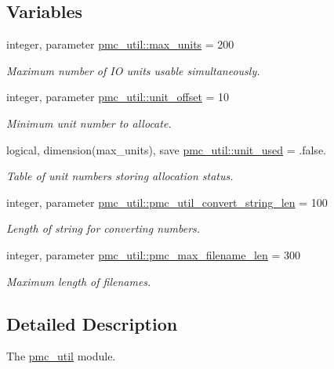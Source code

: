 \subsection*{Variables}
\begin{DoxyCompactItemize}
\item 
integer, parameter \mbox{\hyperlink{namespacepmc__util_a0bc01a46ad6e7b0d503c9181b1101ce0}{pmc\+\_\+util\+::max\+\_\+units}} = 200
\begin{DoxyCompactList}\small\item\em Maximum number of IO units usable simultaneously. \end{DoxyCompactList}\item 
integer, parameter \mbox{\hyperlink{namespacepmc__util_abd64d09b01c7009bc014bd03950e3318}{pmc\+\_\+util\+::unit\+\_\+offset}} = 10
\begin{DoxyCompactList}\small\item\em Minimum unit number to allocate. \end{DoxyCompactList}\item 
logical, dimension(max\+\_\+units), save \mbox{\hyperlink{namespacepmc__util_a172ec1eea3cead7645401a0b8c55fcb0}{pmc\+\_\+util\+::unit\+\_\+used}} = .false.
\begin{DoxyCompactList}\small\item\em Table of unit numbers storing allocation status. \end{DoxyCompactList}\item 
integer, parameter \mbox{\hyperlink{namespacepmc__util_afd468d26aef28509c08087ba8e59089a}{pmc\+\_\+util\+::pmc\+\_\+util\+\_\+convert\+\_\+string\+\_\+len}} = 100
\begin{DoxyCompactList}\small\item\em Length of string for converting numbers. \end{DoxyCompactList}\item 
integer, parameter \mbox{\hyperlink{namespacepmc__util_aca52c78318a6a444ebb5477b532ffeec}{pmc\+\_\+util\+::pmc\+\_\+max\+\_\+filename\+\_\+len}} = 300
\begin{DoxyCompactList}\small\item\em Maximum length of filenames. \end{DoxyCompactList}\end{DoxyCompactItemize}


\subsection{Detailed Description}
The \mbox{\hyperlink{namespacepmc__util}{pmc\+\_\+util}} module. 


